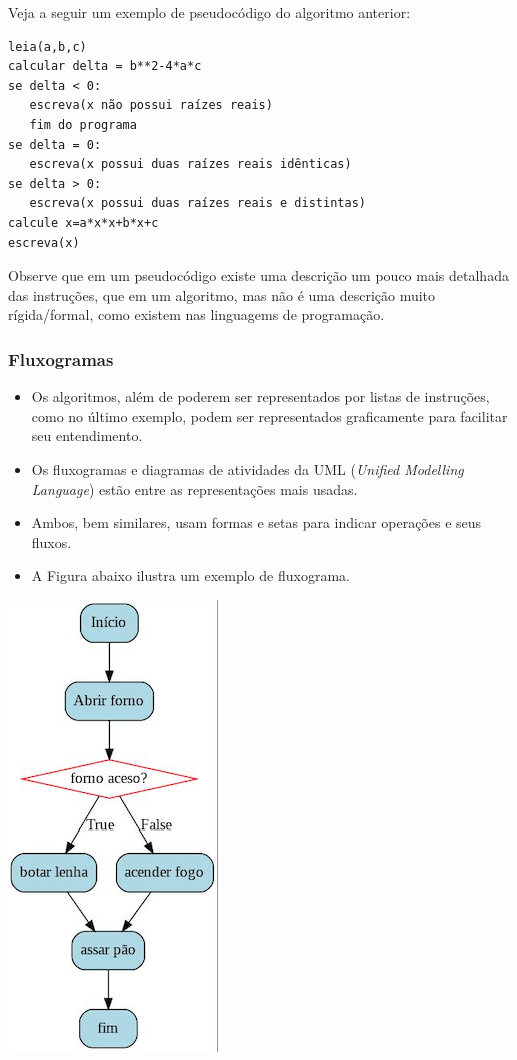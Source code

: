 \documentclass[12pt,a4paper]{article}
\begin{document}
Veja a seguir um exemplo de pseudocódigo do algoritmo anterior:

    \begin{verbatim}
leia(a,b,c)
calcular delta = b**2-4*a*c
se delta < 0: 
   escreva(x não possui raízes reais)
   fim do programa
se delta = 0:
   escreva(x possui duas raízes reais idênticas)
se delta > 0:
   escreva(x possui duas raízes reais e distintas)
calcule x=a*x*x+b*x+c
escreva(x)
\end{verbatim}

    Observe que em um pseudocódigo existe uma descrição um pouco mais
detalhada das instruções, que em um algoritmo, mas não é uma descrição
muito rígida/formal, como existem nas linguagems de programação.

    \hypertarget{fluxogramas}{%
\subsubsection{Fluxogramas}\label{fluxogramas}}

    \begin{itemize}
\item
  Os algoritmos, além de poderem ser representados por listas de
  instruções, como no último exemplo, podem ser representados
  graficamente para facilitar seu entendimento.
\item
  Os fluxogramas e diagramas de atividades da UML (\emph{Unified
  Modelling Language}) estão entre as representações mais usadas.
\item
  Ambos, bem similares, usam formas e setas para indicar operações e
  seus fluxos.
\item
  A Figura abaixo ilustra um exemplo de fluxograma.
\end{itemize}

\includegraphics{"figs/flowchart.jpg"}
\end{document}
